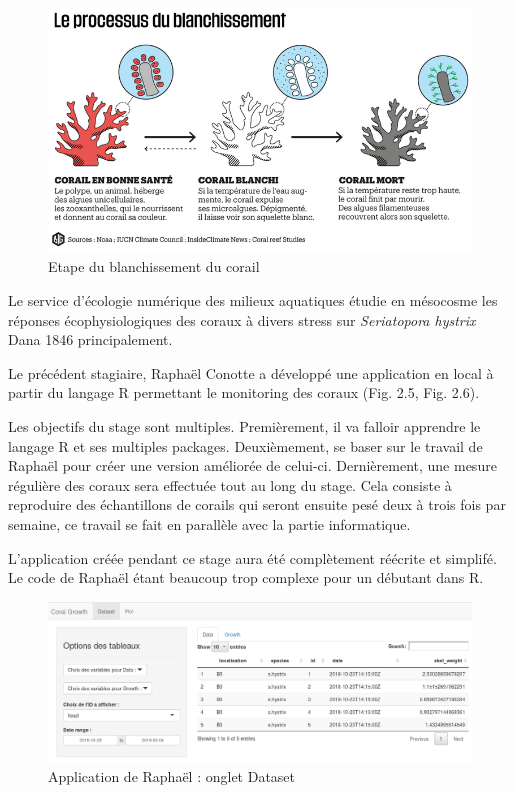 \documentclass[]{report}
\begin{document}
\begin{figure}
\centering
\includegraphics{../image/blanchissement.png}
\caption{Etape du blanchissement du corail}
\end{figure}

Le service d'écologie numérique des milieux aquatiques étudie en
mésocosme les réponses écophysiologiques des coraux à divers stress sur
\emph{Seriatopora hystrix} Dana 1846 principalement.

Le précédent stagiaire, Raphaël Conotte a développé une application en
local à partir du langage R permettant le monitoring des coraux (Fig.
2.5, Fig. 2.6).

Les objectifs du stage sont multiples. Premièrement, il va falloir
apprendre le langage R et ses multiples packages. Deuxièmement, se baser
sur le travail de Raphaël pour créer une version améliorée de celui-ci.
Dernièrement, une mesure régulière des coraux sera effectuée tout au
long du stage. Cela consiste à reproduire des échantillons de corails
qui seront ensuite pesé deux à trois fois par semaine, ce travail se
fait en parallèle avec la partie informatique.

L'application créée pendant ce stage aura été complètement réécrite et
simplifé. Le code de Raphaël étant beaucoup trop complexe pour un
débutant dans R.

\begin{figure}[h!]
\includegraphics[]{../image/raphael1.png}
\caption{Application de Raphaël : onglet Dataset}
\end{figure}
\end{document}
